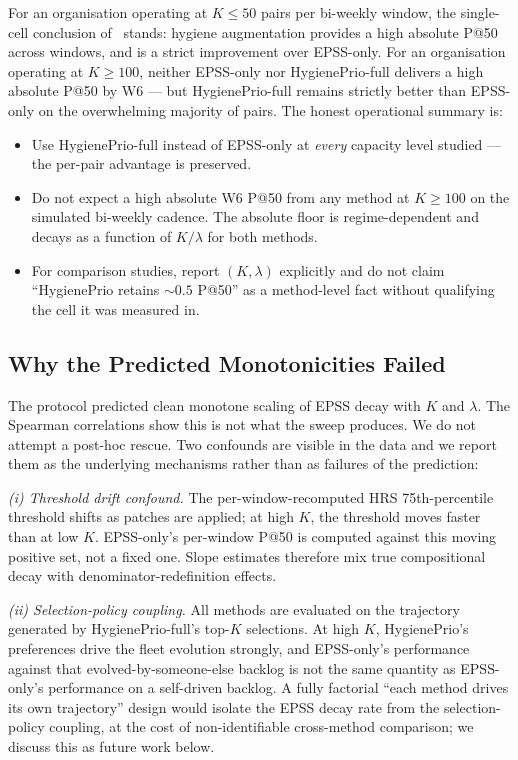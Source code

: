For an organisation operating at $K \leq 50$ pairs per bi-weekly window,
the single-cell conclusion of~\cite{paper5temporal} stands: hygiene augmentation provides a high
absolute P@50 across windows, and is a strict improvement over EPSS-only.
For an organisation operating at $K \geq 100$, neither EPSS-only nor
HygienePrio-full delivers a high absolute P@50 by W6 --- but
HygienePrio-full remains strictly better than EPSS-only on the
overwhelming majority of pairs. The honest operational summary is:
\begin{itemize}
\item Use HygienePrio-full instead of EPSS-only at \textit{every}
capacity level studied --- the per-pair advantage is preserved.
\item Do not expect a high absolute W6 P@50 from any method at
$K \geq 100$ on the simulated bi-weekly cadence. The absolute floor
is regime-dependent and decays as a function of $K/\lambda$ for
both methods.
\item For comparison studies, report $(K, \lambda)$ explicitly and do
not claim ``HygienePrio retains $\sim 0.5$ P@50'' as a method-level
fact without qualifying the cell it was measured in.
\end{itemize}

\subsection{Why the Predicted Monotonicities Failed}

The protocol predicted clean monotone scaling of EPSS decay with $K$
and $\lambda$. The Spearman correlations show this is not what the
sweep produces. We do not attempt a post-hoc rescue. Two confounds
are visible in the data and we report them as the underlying mechanisms
rather than as failures of the prediction:

\textit{(i) Threshold drift confound.} The per-window-recomputed HRS
75th-percentile threshold shifts as patches are applied; at high $K$,
the threshold moves faster than at low $K$. EPSS-only's per-window
P@50 is computed against this moving positive set, not a fixed one.
Slope estimates therefore mix true compositional decay with
denominator-redefinition effects.

\textit{(ii) Selection-policy coupling.} All methods are evaluated on
the trajectory generated by HygienePrio-full's top-$K$ selections. At
high $K$, HygienePrio's preferences drive the fleet evolution
strongly, and EPSS-only's performance against that
evolved-by-someone-else backlog is not the same quantity as
EPSS-only's performance on a self-driven backlog. A fully factorial
``each method drives its own trajectory'' design would isolate
the EPSS decay rate from the selection-policy coupling, at the cost
of non-identifiable cross-method comparison; we discuss this as future
work below.

